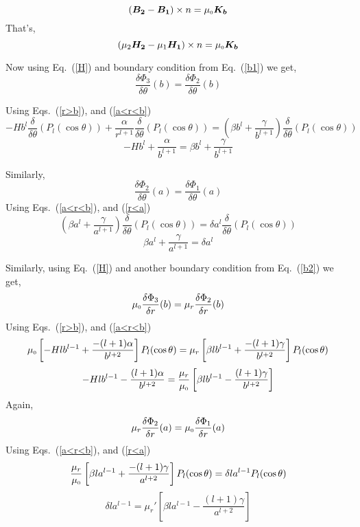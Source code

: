 $$(\bm{B_2} - \bm{B_1})\times n = \mu_{\scriptscriptstyle 0} \bm{K_b}$$
That's,
\begin{equation}\label{b3}   
(\mu_2\bm{H_2} - \mu_1\bm{H_1})\times n = \mu_{\scriptscriptstyle 0} \bm{K_b}  
\end{equation}

Now using Eq.~(\ref{H}) and boundary condition from Eq.~(\ref{b1}) we get,
$$\frac{\delta \Phi_3}{\delta \theta}(b)=\frac{\delta \Phi_2}{\delta \theta}(b)$$

Using Eqs.~(\ref{r>b}), and (\ref{a<r<b})
$$-Hb^l\frac{\delta}{\delta \theta}(P_l(\cos\theta))+\frac{\alpha}{r^{l+1}}\frac{\delta}{\delta \theta}(P_l(\cos\theta))=\left(\beta b^l+\frac{\gamma}{b^{l+1}}\right)\frac{\delta}{\delta \theta}(P_l(\cos\theta))$$
\begin{equation}\label{e01}
-Hb^l+\frac{\alpha}{b^{l+1}}=\beta b^l+\frac{\gamma}{b^{l+1}}
\end{equation}

Similarly,
$$\frac{\delta \Phi_2}{\delta \theta}(a)=\frac{\delta \Phi_1}{\delta \theta}(a)$$
Using Eqs.~(\ref{a<r<b}), and (\ref{r<a})
$$\left(\beta a^l+\frac{\gamma}{a^{l+1}}\right)\frac{\delta}{\delta \theta}(P_l(\cos\theta))=\delta a^l \frac{\delta}{\delta \theta}(P_l(\cos\theta))$$
\begin{equation}\label{e02}
\beta a^l+\frac{\gamma}{a^{l+1}}=\delta a^l
\end{equation}

Similarly, using Eq.~(\ref{H}) and another boundary condition from Eq.~(\ref{b2}) we get,
$$\mu_{\scriptscriptstyle 0}\frac{\delta \Phi_3}{\delta r}(b)=\mu_r\frac{\delta \Phi_2}{\delta r}(b)$$
Using Eqs.~(\ref{r>b}), and (\ref{a<r<b})
$$\mu_{\scriptscriptstyle 0}\left[-Hlb^{l-1}+\frac{-(l+1)\alpha}{b^{l+2}}\right]P_l(\cos\theta)=\mu_r\left[\beta l b^{l-1}+\frac{-(l+1)\gamma}{b^{l+2}}\right]P_l(\cos\theta)$$
\begin{equation}\label{e03}
-Hlb^{l-1}-\frac{(l+1)\alpha}{b^{l+2}}=\frac{\mu_r}{\mu_{\scriptscriptstyle 0}}\left[\beta l b^{l-1}-\frac{(l+1)\gamma}{b^{l+2}}\right]
\end{equation}
Again,
$$\mu_r\frac{\delta \Phi_2}{\delta r}(a)=\mu_{\scriptscriptstyle 0}\frac{\delta \Phi_1}{\delta r}(a)$$
Using Eqs.~(\ref{a<r<b}), and (\ref{r<a})
$$\frac{\mu_r}{\mu_{\scriptscriptstyle 0}}\left[\beta l a^{l-1}+\frac{-(l+1)\gamma}{a^{l+2}}\right]P_l(\cos\theta)=\delta l a^{l-1} P_l(\cos\theta)$$
\begin{equation}\label{e04}
\delta l a^{l-1}=\mu_r'\left[\beta l a^{l-1}-\frac{(l+1)\gamma}{a^{l+2}}\right]
\end{equation}


